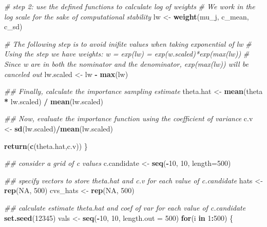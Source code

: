 \documentclass[
]{article}
\newenvironment{Shaded}{\begin{snugshade}}{\end{snugshade}}
\newcommand{\CommentTok}[1]{\textcolor[rgb]{0.56,0.35,0.01}{\textit{#1}}}
\newcommand{\ControlFlowTok}[1]{\textcolor[rgb]{0.13,0.29,0.53}{\textbf{#1}}}
\newcommand{\DataTypeTok}[1]{\textcolor[rgb]{0.13,0.29,0.53}{#1}}
\newcommand{\DecValTok}[1]{\textcolor[rgb]{0.00,0.00,0.81}{#1}}
\newcommand{\KeywordTok}[1]{\textcolor[rgb]{0.13,0.29,0.53}{\textbf{#1}}}
\newcommand{\NormalTok}[1]{#1}
\newcommand{\OperatorTok}[1]{\textcolor[rgb]{0.81,0.36,0.00}{\textbf{#1}}}
\newcommand{\OtherTok}[1]{\textcolor[rgb]{0.56,0.35,0.01}{#1}}
\newcommand{\StringTok}[1]{\textcolor[rgb]{0.31,0.60,0.02}{#1}}
\begin{document}
\begin{Shaded}
\begin{Highlighting}[]
{{{{    
    \CommentTok{# step 2: use the defined functions to calculate log of weights}
    \CommentTok{# We work in the log scale for the sake of computational stability}
\NormalTok{    lw <-}\StringTok{ }\KeywordTok{weight}\NormalTok{(mu_j, c_mean, c_sd)}
    
    
    \CommentTok{# The following step is to avoid inifite values when taking exponential of lw}
    \CommentTok{# Using the step we have weights:  w = exp(lw) = exp(w.scaled)*exp(max(lw))}
    \CommentTok{# Since w are in both the nominator and the denominator, exp(max(lw)) will be canceled out}
\NormalTok{    lw.scaled <-}\StringTok{ }\NormalTok{lw }\OperatorTok{-}\StringTok{ }\KeywordTok{max}\NormalTok{(lw)}
 

    \CommentTok{## Finally, calculate the importance sampling estimate}
\NormalTok{    theta.hat <-}\StringTok{ }\KeywordTok{mean}\NormalTok{(theta }\OperatorTok{*}\StringTok{ }\NormalTok{lw.scaled) }\OperatorTok{/}\StringTok{ }\KeywordTok{mean}\NormalTok{(lw.scaled)}

        
    \CommentTok{## Now, evaluate the importance function using the coefficient of variance}
\NormalTok{    c.v <-}\StringTok{ }\KeywordTok{sd}\NormalTok{(lw.scaled)}\OperatorTok{/}\KeywordTok{mean}\NormalTok{(lw.scaled)}
    
    
    \KeywordTok{return}\NormalTok{(}\KeywordTok{c}\NormalTok{(theta.hat,c.v))}
\NormalTok{\}}


\CommentTok{## consider a grid of c values}
\NormalTok{c.candidate <-}\StringTok{ }\KeywordTok{seq}\NormalTok{(}\OperatorTok{-}\DecValTok{10}\NormalTok{, }\DecValTok{10}\NormalTok{, }\DataTypeTok{length=}\DecValTok{500}\NormalTok{)}


\CommentTok{## specify vectors to store theta.hat and c.v for each value of c.candidate}
\NormalTok{hats <-}\StringTok{ }\KeywordTok{rep}\NormalTok{(}\OtherTok{NA}\NormalTok{, }\DecValTok{500}\NormalTok{)}
\NormalTok{cvs_hats <-}\StringTok{ }\KeywordTok{rep}\NormalTok{(}\OtherTok{NA}\NormalTok{, }\DecValTok{500}\NormalTok{)}


\CommentTok{## calculate estimate theta.hat and coef of var for each value of c.candidate}
\KeywordTok{set.seed}\NormalTok{(}\DecValTok{12345}\NormalTok{)}
\NormalTok{vals <-}\StringTok{ }\KeywordTok{seq}\NormalTok{(}\OperatorTok{-}\DecValTok{10}\NormalTok{, }\DecValTok{10}\NormalTok{, }\DataTypeTok{length.out =} \DecValTok{500}\NormalTok{)}
\ControlFlowTok{for}\NormalTok{(i }\ControlFlowTok{in} \DecValTok{1}\OperatorTok{:}\DecValTok{500}\NormalTok{) \{}

}}}}
\end{Highlighting}
\end{Shaded}
\end{document}
